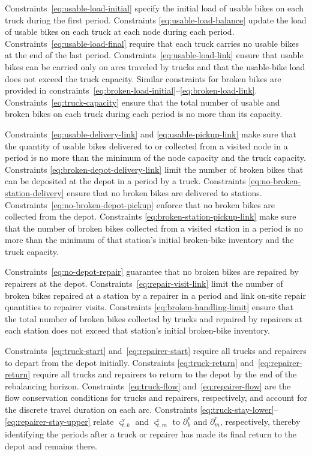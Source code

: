 Constraints~\eqref{eq:usable-load-initial} specify the initial load of usable
bikes on each truck during the first period. Constraints
\eqref{eq:usable-load-balance} update the load of usable bikes on each truck at
each node during each period. Constraints~\eqref{eq:usable-load-final} require
that each truck carries no usable bikes at the end of the last period.
Constraints~\eqref{eq:usable-load-link} ensure that usable bikes can be carried
only on arcs traveled by trucks and that the usable-bike load does not exceed the
truck capacity. Similar constraints for broken bikes are provided in
constraints~\eqref{eq:broken-load-initial}--\eqref{eq:broken-load-link}.
Constraints~\eqref{eq:truck-capacity} ensure that the total number of usable and
broken bikes on each truck during each period is no more than its capacity.

Constraints~\eqref{eq:usable-delivery-link} and
\eqref{eq:usable-pickup-link} make sure that the quantity of usable bikes
delivered to or collected from a visited node in a period is no more than the
minimum of the node capacity and the truck capacity. Constraints
\eqref{eq:broken-depot-delivery-link} limit the number of broken bikes that can
be deposited at the depot in a period by a truck. Constraints
\eqref{eq:no-broken-station-delivery} ensure that no broken bikes are delivered
to stations. Constraints~\eqref{eq:no-broken-depot-pickup} enforce that no
broken bikes are collected from the depot. Constraints
\eqref{eq:broken-station-pickup-link} make sure that the number of broken bikes
collected from a visited station in a period is no more than the minimum of that
station's initial broken-bike inventory and the truck capacity.

Constraints~\eqref{eq:no-depot-repair} guarantee that no broken bikes are
repaired by repairers at the depot. Constraints~\eqref{eq:repair-visit-link}
limit the number of broken bikes repaired at a station by a repairer in a period
and link on-site repair quantities to repairer visits. Constraints
\eqref{eq:broken-handling-limit} ensure that the total number of broken bikes
collected by trucks and repaired by repairers at each station does not exceed
that station's initial broken-bike inventory.

Constraints~\eqref{eq:truck-start} and~\eqref{eq:repairer-start} require all
trucks and repairers to depart from the depot initially. Constraints
\eqref{eq:truck-return} and~\eqref{eq:repairer-return} require all trucks and
repairers to return to the depot by the end of the rebalancing horizon.
Constraints~\eqref{eq:truck-flow} and~\eqref{eq:repairer-flow} are the flow
conservation conditions for trucks and repairers, respectively, and account for
the discrete travel duration on each arc. Constraints
\eqref{eq:truck-stay-lower}--\eqref{eq:repairer-stay-upper} relate
$\varsigma_{t,k}^{\mathrm{v}}$ and $\varsigma_{t,m}^{\mathrm{r}}$ to
$\partial_k^{\mathrm{v}}$ and $\partial_m^{\mathrm{r}}$, respectively, thereby
identifying the periods after a truck or repairer has made its final return to
the depot and remains there.

